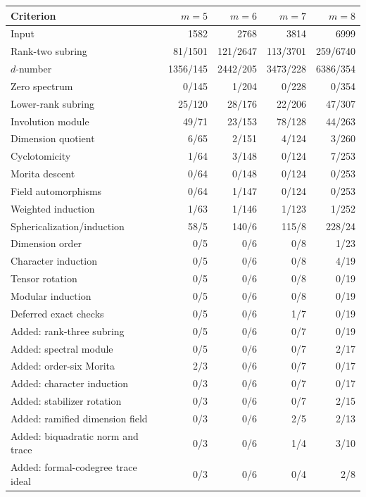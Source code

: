 \begin{table}[p]\centering\small
\setlength{\tabcolsep}{3pt}
\begin{tabular*}{\textwidth}{@{\extracolsep{\fill}}lrrrr@{}}\toprule
Criterion & $m=5$ & $m=6$ & $m=7$ & $m=8$\\\midrule
Input & 1582 & 2768 & 3814 & 6999\\
Rank-two subring & 81/1501 & 121/2647 & 113/3701 & 259/6740\\
$d$-number & 1356/145 & 2442/205 & 3473/228 & 6386/354\\
Zero spectrum & 0/145 & 1/204 & 0/228 & 0/354\\
Lower-rank subring & 25/120 & 28/176 & 22/206 & 47/307\\
Involution module & 49/71 & 23/153 & 78/128 & 44/263\\
Dimension quotient & 6/65 & 2/151 & 4/124 & 3/260\\
Cyclotomicity & 1/64 & 3/148 & 0/124 & 7/253\\
Morita descent & 0/64 & 0/148 & 0/124 & 0/253\\
Field automorphisms & 0/64 & 1/147 & 0/124 & 0/253\\
Weighted induction & 1/63 & 1/146 & 1/123 & 1/252\\
Sphericalization/induction & 58/5 & 140/6 & 115/8 & 228/24\\
Dimension order & 0/5 & 0/6 & 0/8 & 1/23\\
Character induction & 0/5 & 0/6 & 0/8 & 4/19\\
Tensor rotation & 0/5 & 0/6 & 0/8 & 0/19\\
Modular induction & 0/5 & 0/6 & 0/8 & 0/19\\
Deferred exact checks & 0/5 & 0/6 & 1/7 & 0/19\\
Added: rank-three subring & 0/5 & 0/6 & 0/7 & 0/19\\
Added: spectral module & 0/5 & 0/6 & 0/7 & 2/17\\
Added: order-six Morita & 2/3 & 0/6 & 0/7 & 0/17\\
Added: character induction & 0/3 & 0/6 & 0/7 & 0/17\\
Added: stabilizer rotation & 0/3 & 0/6 & 0/7 & 2/15\\
Added: ramified dimension field & 0/3 & 0/6 & 2/5 & 2/13\\
Added: biquadratic norm and trace & 0/3 & 0/6 & 1/4 & 3/10\\
Added: formal-codegree trace ideal & 0/3 & 0/6 & 0/4 & 2/8\\

\end{tabular*}
\end{table}
